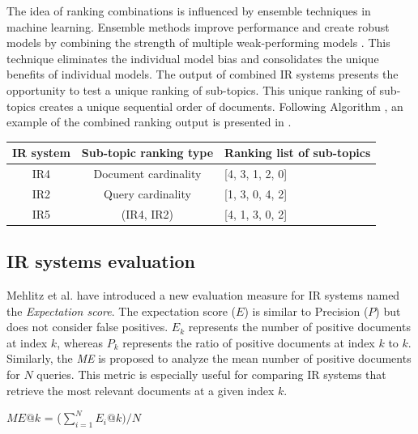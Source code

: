 The idea of ranking combinations is influenced by ensemble techniques in machine learning. Ensemble methods improve performance and create robust models by combining the strength of multiple weak-performing models \cite{bi2019machine}. This technique eliminates the individual model bias and consolidates the unique benefits of individual models. The output of combined \ac{IR} systems presents the opportunity to test a unique ranking of sub-topics. This unique ranking of sub-topics creates a unique sequential order of documents. Following Algorithm , an example of the combined ranking output is presented in .

 
 
 \begin{center}
 	\label{tab:ir5_result}
 	\begin{tabularx}{0.8\textwidth}{|c|c|Y|}
 		\hline

 			IR system & Sub-topic ranking type & Ranking list of sub-topics \\
 		\hline
 		IR4 & Document cardinality  & [4, 3, 1, 2, 0] \\
 		\hline
 		IR2 & Query cardinality  & [1, 3, 0, 4, 2] \\
 		\hline
 		IR5 & (IR4, IR2) & [4, 1, 3, 0, 2] \\
 		\hline
 	\end{tabularx}
 \end{center}
 

\subsection{IR systems evaluation}

Mehlitz et al. \cite{mehlitz2007new} have introduced a new evaluation measure for \ac{IR} systems named the \textit{Expectation score}. The expectation score ($E$) is similar to Precision ($P$) but does not consider false positives. $E_k$ represents the number of positive documents at index $k$, whereas $P_k$ represents the ratio of positive documents at index $k$ to $k$. Similarly, the \textit{\ac{ME}} is proposed to analyze the mean number of positive documents for $N$ queries. This metric is especially useful for comparing \ac{IR} systems that retrieve the most relevant documents at a given index $k$.



\centerline{$ME@k$ = ($\sum\limits_{i=1}^N E_i@k) /N$}

